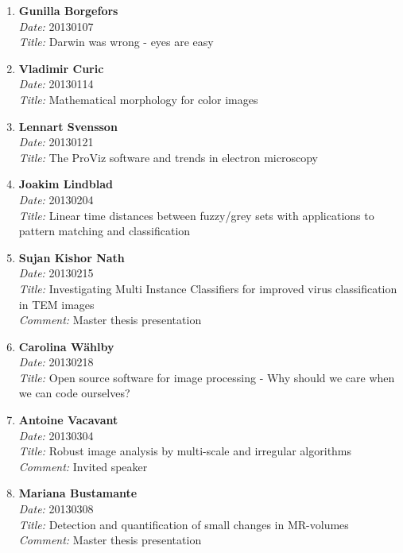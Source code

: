 \begin{enumerate}
\item
{\bf Gunilla Borgefors}~\\
{\em Date:} 20130107 ~\\
{\em Title:} Darwin was wrong - eyes are easy 

\item
{\bf Vladimir Curic}~\\
{\em Date:} 20130114 ~\\
{\em Title:} Mathematical morphology for color images

\item
{\bf Lennart Svensson}~\\
{\em Date:} 20130121 ~\\
{\em Title:} The ProViz software and trends in electron microscopy

\item
{\bf Joakim Lindblad}~\\
{\em Date:} 20130204 ~\\
{\em Title:} Linear time distances between fuzzy/grey sets with applications to pattern matching and classification

\item
{\bf Sujan Kishor Nath}~\\
{\em Date:} 20130215 ~\\
{\em Title:} Investigating Multi Instance Classifiers for improved virus classification in TEM images~\\
{\em Comment:} Master thesis presentation

\item
{\bf Carolina W\"{a}hlby}~\\
{\em Date:} 20130218 ~\\
{\em Title:} Open source software for image processing - Why should we care when we can code ourselves?

\item 
{\bf Antoine Vacavant }~\\
{\em Date:} 20130304~\\
{\em Title:} Robust image analysis by multi-scale and irregular algorithms 
{\em Comment:} Invited speaker

\item
{\bf Mariana Bustamante}~\\
{\em Date:} 20130308 ~\\
{\em Title:} Detection and quantification of small changes in MR-volumes ~\\
{\em Comment:} Master thesis presentation


\end{enumerate}
